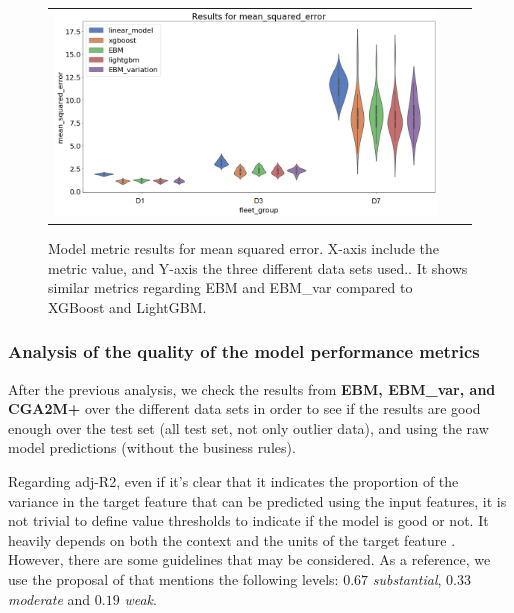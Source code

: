 \begin{figure}[h!]
\centering
 \begin{tabular}{c@{\qquad}c@{\qquad}c}
\includegraphics[width=0.8\columnwidth]{figures/chapter6_LucaFleet/model_metrics_mean_squared_error.PNG}
  \end{tabular} 
  \caption{Model metric results for mean squared error. X-axis include the metric value, and Y-axis the three different data sets used.\label{fig:ch6-model-metrics-mean-squared-error}. It shows similar metrics regarding EBM and EBM\_var compared to XGBoost and LightGBM.}
\end{figure}

\subsubsection{Analysis of the quality of the model performance metrics}\label{subsubsec:ch6-quality-model-performance}
After the previous analysis, we check the results from \textbf{EBM, EBM\_var, and CGA2M+} over the different data sets in order to see if the results are good enough over the test set (all test set, not only outlier data), and using the raw model predictions (without the business rules).

Regarding adj-R2, even if it's clear that it indicates the proportion of the variance in the target feature that can be predicted using the input features, it is not trivial to define value thresholds to indicate if the model is good or not. It heavily depends on both the context and the units of the target feature \parencite{hair2016primer, hair2013partial}. However, there are some guidelines that may be considered. As a reference, we use the proposal of \parencite{chin1999structural} that mentions the following levels: $0.67$ \textit{substantial}, $0.33$ \textit{moderate} and $0.19$ \textit{weak}.

